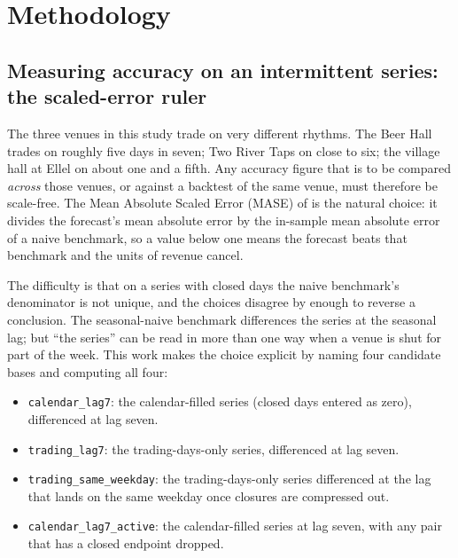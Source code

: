 
\chapter{Methodology}
\label{chap:methodology}

\section{Measuring accuracy on an intermittent series: the scaled-error ruler}
\label{sec:metric-ruler}

The three venues in this study trade on very different rhythms. The Beer Hall trades on
roughly five days in seven; Two River Taps on close to six; the village hall at Ellel on
about one and a fifth. Any accuracy figure that is to be compared \emph{across} those
venues, or against a backtest of the same venue, must therefore be scale-free. The Mean
Absolute Scaled Error (MASE) of \citet{hyndman_another_2006} is the natural choice: it
divides the forecast's mean absolute error by the in-sample mean absolute error of a naive
benchmark, so a value below one means the forecast beats that benchmark and the units of
revenue cancel.

The difficulty is that on a series with closed days the naive benchmark's denominator is
not unique, and the choices disagree by enough to reverse a conclusion. The seasonal-naive
benchmark differences the series at the seasonal lag; but ``the series'' can be read in more
than one way when a venue is shut for part of the week. This work makes the choice explicit
by naming four candidate bases and computing all four:

\begin{itemize}
  \item \texttt{calendar\_lag7}: the calendar-filled series (closed days entered as zero),
        differenced at lag seven.
  \item \texttt{trading\_lag7}: the trading-days-only series, differenced at lag seven.
  \item \texttt{trading\_same\_weekday}: the trading-days-only series differenced at the
        lag that lands on the same weekday once closures are compressed out.
  \item \texttt{calendar\_lag7\_active}: the calendar-filled series at lag seven, with any
        pair that has a closed endpoint dropped.
\end{itemize}

